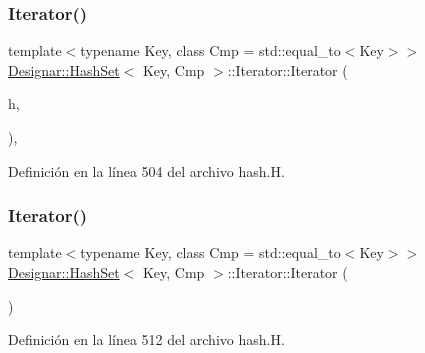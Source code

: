 \subsubsection{\texorpdfstring{Iterator()}{Iterator()}\hspace{0.1cm}{\footnotesize\ttfamily [1/5]}}
{\footnotesize\ttfamily template$<$typename Key, class Cmp = std\+::equal\+\_\+to$<$\+Key$>$$>$ \\
\hyperlink{class_designar_1_1_hash_set}{Designar\+::\+Hash\+Set}$<$ Key, Cmp $>$\+::Iterator\+::\+Iterator (\begin{DoxyParamCaption}\item[{const \hyperlink{class_designar_1_1_hash_set}{Hash\+Set} \&}]{h,  }\item[{int}]{ }\end{DoxyParamCaption})\hspace{0.3cm}{\ttfamily [inline]}, {\ttfamily [protected]}}



Definición en la línea 504 del archivo hash.\+H.

\mbox{\label{class_designar_1_1_hash_set_1_1_iterator_a35f9b2ac54be788fa6c2b8a274c7e308}} 
\subsubsection{\texorpdfstring{Iterator()}{Iterator()}\hspace{0.1cm}{\footnotesize\ttfamily [2/5]}}
{\footnotesize\ttfamily template$<$typename Key, class Cmp = std\+::equal\+\_\+to$<$\+Key$>$$>$ \\
\hyperlink{class_designar_1_1_hash_set}{Designar\+::\+Hash\+Set}$<$ Key, Cmp $>$\+::Iterator\+::\+Iterator (\begin{DoxyParamCaption}{ }\end{DoxyParamCaption})\hspace{0.3cm}{\ttfamily [inline]}}



Definición en la línea 512 del archivo hash.\+H.

\mbox{\label{class_designar_1_1_hash_set_1_1_iterator_a1047f02ec4c3bfd5919ef66b28ca537c}} 
